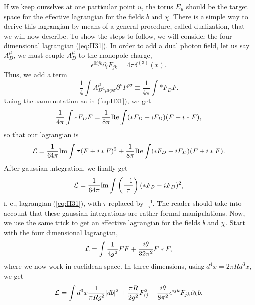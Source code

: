 If we keep ourselves at one particular point $u$, the torus $E_u$
should be the target space for the effective lagrangian for the
fields $b$ and $\chi$. There is a simple way to derive this
lagrangian by means of a general procedure, called dualization,
that we will now describe. To show the steps to follow, we will
consider the four dimensional lagrangian (\ref{eq:II31}). In
order to add a dual photon field, let us say $A_D^{\mu}$, we must
couple $A_D^{\mu}$ to the monopole charge,
\begin{equation}
\epsilon^{0ijk} \partial_i F_{jk} = 4\pi \delta^{(3)}(x).
\label{eq:II43}
\end{equation}
Thus, we add a term
\begin{equation}
\frac {1}{4} \int A_D^{\mu} \epsilon_{\mu \nu \rho \sigma}
\partial^{\nu} F^{\rho \sigma} \equiv \frac {1}{4\pi} \int *F_D
F.
\label{eq:II44}
\end{equation}
Using the same notation as in (\ref{eq:II31}), we get
\begin{equation}
\frac {1}{4\pi} \int *F_D F = \frac {1}{8 \pi} \hbox {Re} \int
(*F_D-iF_D)(F+i*F),
\label{eq:II45}
\end{equation}
so that our lagrangian is
\begin{equation}
{\cal L} = \frac {1}{64 \pi} \hbox {Im} \int \tau (F+i*F)^2 +
\frac {1}{8\pi} \hbox {Re} \int (*F_D-iF_D)(F+i*F).
\label{eq:II46}
\end{equation}
After gaussian integration, we finally get
\begin{equation}
{\cal L} = \frac {1}{64\pi} \hbox {Im} \int \left( \frac
{-1}{\tau} \right) (*F_D-iF_D)^2,
\label{eq:II47}
\end{equation}
i. e., lagrangian (\ref{eq:II31}), with $\tau$ replaced by $\frac
{-1}{\tau}$. The reader should take into account that these
gaussian integrations are rather formal manipulations. Now, we
use the same trick to get an effective lagrangian for the fields
$b$ and $\chi$. Start with the four dimensional lagrangian,
\begin{equation}
{\cal L} = \int \frac {1}{4g^2}FF+ \frac {i\theta}{32 \pi^2} F*F,
\label{eq:II48}
\end{equation}
where we now work in euclidean space. In three dimensions,
using $d^4x = 2 \pi R d^3x$, we get
\begin{equation}
{\cal L} = \int d^3x \frac {1}{\pi Rg^2} |db|^2+ \frac {\pi
R}{2g^2} F_{ij}^2 + \frac {i \theta}{8\pi^2} \epsilon^{ijk}F_{jk}
\partial_k b.
\label{eq:II49}
\end{equation}
